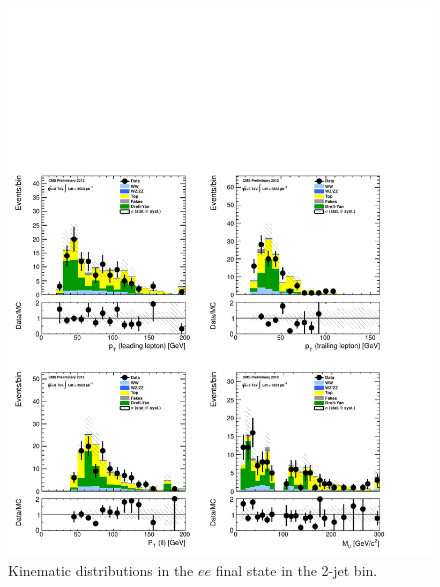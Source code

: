 \begin{figure}[!hbtp]
\centering
\includegraphics[width=1\textwidth]{figures/ww_analysis20_0_ALL_ee_2j.pdf}
\caption{Kinematic distributions in the $ee$ final state in the 2-jet bin.}
\label{fig:xs_kinematics_ee_2j}
\end{figure}
